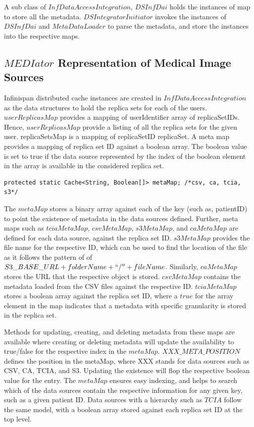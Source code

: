 \documentclass[letterpaper, 10 pt, conference]{ieeeconf}  %
\begin{document}
A sub class of $InfDataAccessIntegration$, $DSInfDai$ holds the instances of map to store all the metadata. $DSIntegratorInitiator$ invokes the instances of $DSInfDai$ and $MetaDataLoader$ to parse the metadata, and store the instances into the respective maps. 

\subsection{$MEDIator$ Representation of Medical Image Sources}
Infinispan distributed cache instances are created in $InfDataAccessIntegration$ as the data structures to hold the replica sets for each of the users. $userReplicasMap$ provides a mapping of userIdentifier  array of replicaSetIDs. Hence, $userReplicasMap$ provide a listing of all the replica sets for the given user. replicaSetsMap is a mapping of replicaSetID  replicaSet. A meta map provides a  mapping of replica set ID against a boolean array. The boolean value is set to true if the data source represented by the index of the boolean element in the array is available in the considered replica set.

\vspace{-15pt}
\begin{lstlisting}  
protected static Cache<String, Boolean[]> metaMap; /*csv, ca, tcia, s3*/
\end{lstlisting} 
\vspace{-7pt}

The $metaMap$ stores a binary array against each of the key (such as, patientID) to point the existence of metadata in the data sources defined. Further, meta maps such as $tciaMetaMap$, $csvMetaMap$, $s3MetaMap$, and $caMetaMap$ are defined for each data source, against the replica set ID. $s3MetaMap$ provides the file name for the respective ID, which can be used to find the location of the file as it follows the pattern of of $S3\_BASE\_URL + folderName + ``/'' + fileName$. Similarly, $caMetaMap$ stores the URL that the respective object is stored. $csvMetaMap$ contains the metadata loaded from the CSV files against the respective ID. $tciaMetaMap$ stores a boolean array against the replica set ID, where a $true$ for the array element in the map indicates that a metadata with specific granularity is stored in the replica set.

Methods for updating, creating, and deleting metadata from these maps are available where creating or deleting metadata will update the availability to true/false for the respective index in the $metaMap$. $XXX\_META\_POSITION$ defines the position in the metaMap, where XXX stands for data sources such as CSV, CA, TCIA, and S3. Updating the existence will flop the respective boolean value for the entry. The $metaMap$ ensures easy indexing, and helps to search which of the data sources contain the respective information for any given key, such as a given patient ID. Data sources with a hierarchy such as $TCIA$ follow the same model, with a boolean array stored against each replica set ID at the top level.
\end{document}
